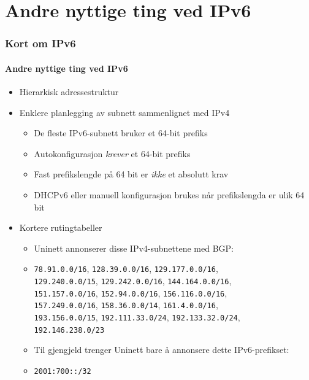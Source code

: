 \section{Andre nyttige ting ved IPv6}
\begin{frame}%
  \frametitle{Kort om IPv6}
  \framesubtitle{Andre nyttige ting ved IPv6}
  \pause
  \begin{itemize}[<+->]
  \item Hierarkisk adressestruktur
  \item Enklere planlegging av subnett sammenlignet med IPv4
    \begin{itemize}[<+->]
    \item De fleste IPv6-subnett bruker et 64-bit prefiks
    \item Autokonfigurasjon \textit{krever\/} et 64-bit prefiks
    \item Fast prefikslengde på 64 bit er \textit{ikke\/} et absolutt
      krav
    \item DHCPv6 eller manuell konfigurasjon brukes når prefikslengda
      er ulik 64 bit
    \end{itemize}
  \item Kortere rutingtabeller
    \begin{itemize}[<+->]
    \item Uninett annonserer disse IPv4-subnettene med BGP:
    \item \texttt{78.91.0.0/16}, \hfill\alert<11>{\texttt{128.39.0.0/16}}, \hfill\texttt{129.177.0.0/16},\\
      \texttt{129.240.0.0/15}, \hfill\texttt{129.242.0.0/16}, \hfill\texttt{144.164.0.0/16},\\
      \texttt{151.157.0.0/16}, \hfill\texttt{152.94.0.0/16}, \hfill\texttt{156.116.0.0/16},\\
      \texttt{157.249.0.0/16}, \hfill\texttt{158.36.0.0/14}, \hfill\texttt{161.4.0.0/16},\\
      \texttt{193.156.0.0/15}, \hfill\texttt{192.111.33.0/24}, \hfill\texttt{192.133.32.0/24},\\
      \hfill\texttt{192.146.238.0/23}\hfill\null
      \pause
    \item Til gjengjeld trenger Uninett bare å annonsere dette
      IPv6-prefikset:
    \item \texttt{2001:700::/32}
    \end{itemize}
  \end{itemize}
\end{frame}

